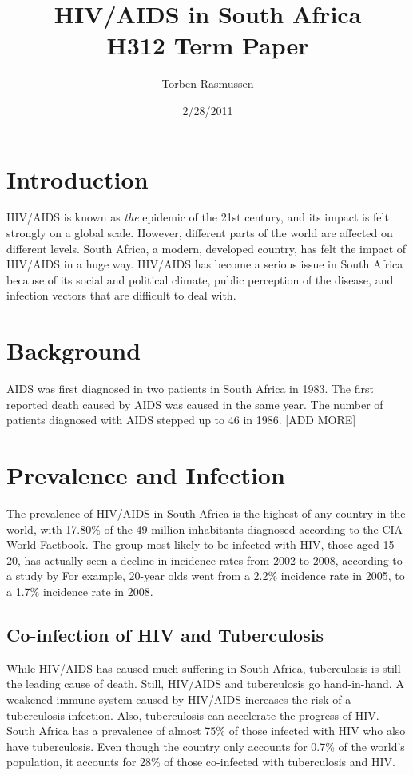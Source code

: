 \documentclass[12pt]{article}
\title{HIV/AIDS in South Africa \\ H312 Term Paper}
\author{Torben Rasmussen}
\date{2/28/2011}
\begin{document}
\maketitle
\thispagestyle{empty}
\pagestyle{fancy}
\newpage

\section{Introduction}
HIV/AIDS is known as \emph{the} epidemic of the 21st century, and its impact is felt strongly on a global scale.
However, different parts of the world are affected on different levels.  
South Africa, a modern, developed country, has felt the impact of HIV/AIDS in a huge way.  
HIV/AIDS has become a serious issue in South Africa because of its social and political climate, public perception of the disease, and infection vectors that are difficult to deal with. 

\section{Background}
AIDS was first diagnosed in two patients in South Africa in 1983.  The first reported death caused by AIDS was caused in the same year.
The number of patients diagnosed with AIDS stepped up to 46 in 1986. [ADD MORE]

\section{Prevalence and Infection}
The prevalence of HIV/AIDS in South Africa is the highest of any country in the world, with 17.80\% of the 49 million inhabitants diagnosed according to the CIA World Factbook.  
The group most likely to be infected with HIV, those aged 15-20, has actually seen a decline in incidence rates from 2002 to 2008, according to a study by 
For example, 20-year olds went from a 2.2\% incidence rate in 2005, to a 1.7\% incidence rate in 2008.

\subsection{Co-infection of HIV and Tuberculosis}
While HIV/AIDS has caused much suffering in South Africa, tuberculosis is still the leading cause of death.
Still, HIV/AIDS and tuberculosis go hand-in-hand.
A weakened immune system caused by HIV/AIDS increases the risk of a tuberculosis infection.
Also, tuberculosis can accelerate the progress of HIV.
South Africa has a prevalence of almost 75\% of those infected with HIV who also have tuberculosis.
Even though the country only accounts for 0.7\% of the world's population, it accounts for 28\% of those co-infected with tuberculosis and HIV.
\end{document}
